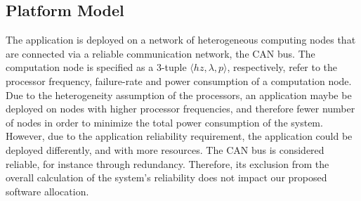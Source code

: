 \subsection{Platform Model}
The application is deployed on a network of heterogeneous computing nodes that are connected via a reliable communication network, the CAN bus. The computation node is specified as a 3-tuple $\langle hz, \lambda, p \rangle$, respectively, refer to the processor frequency, failure-rate and power consumption of a computation node. Due to the heterogeneity assumption of the processors, an application maybe be deployed on nodes with higher processor frequencies, and therefore fewer number of nodes in order to minimize the total power consumption of the system. However, due to the application reliability requirement, the application could be deployed differently, and with more resources. The CAN bus is considered reliable, for instance through redundancy. Therefore, its exclusion from the overall calculation of the system's reliability does not impact our proposed software allocation. %

